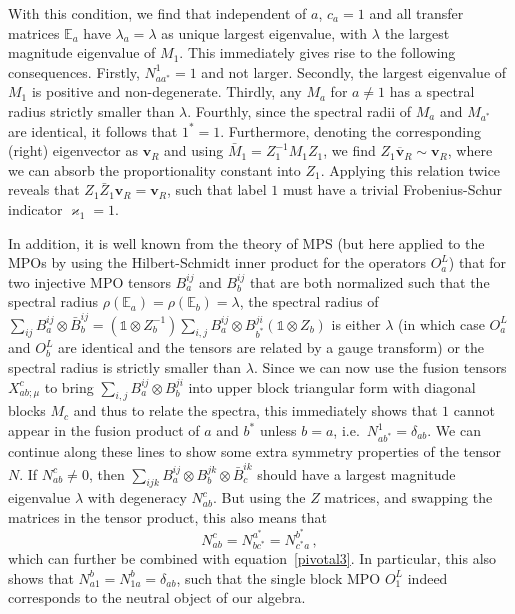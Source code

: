 \documentclass[12 pt]{article}
\begin{document}
With this condition, we find that independent of $a$, $c_a = 1$ and all transfer matrices $\mathbb{E}_{a}$ have $\lambda_a=\lambda$ as unique largest eigenvalue, with $\lambda$ the largest magnitude eigenvalue of $M_1$. This immediately gives rise to the following consequences. Firstly, $N_{aa^*}^{1}=1$ and not larger. Secondly, the largest eigenvalue of $M_1$ is positive and non-degenerate. Thirdly, any $M_{a}$ for $a\neq 1$ has a spectral radius strictly smaller than $\lambda$. Fourthly, since the spectral radii of $M_{a}$ and $M_{a^*}$ are identical, it follows that $1^* = 1$. Furthermore, denoting the corresponding (right) eigenvector as $\mathbf{v}_{R}$ and using $\bar{M}_1 = Z_1^{-1} M_1 Z_{1}$, we find $Z_1 \overline{\mathbf{v}}_{R} \sim \mathbf{v}_{R}$, where we can absorb the proportionality constant into $Z_1$. Applying this relation twice reveals that $Z_1\bar{Z}_1 \mathbf{v}_{R} = \mathbf{v}_{R}$, such that label $1$ must have a trivial Frobenius-Schur indicator $\varkappa_1=1$.

In addition, it is well known from the theory of MPS (but here applied to the MPOs by using the Hilbert-Schmidt inner product for the operators $O_a^L$) that for two injective MPO tensors $B_a^{ij}$ and $B_{b}^{ij}$ that are both normalized such that the spectral radius $\rho(\mathbb{E}_{a}) = \rho(\mathbb{E}_{b}) = \lambda$, the spectral radius of $\sum_{ij} B_{a}^{ij}\otimes \bar{B}_{b}^{ij} = (\mathds{1}\otimes Z_{b}^{-1}) \sum_{i,j} B^{ij}_a \otimes B^{ji}_{b^*} (\mathds{1}\otimes Z_{b})$ is either $\lambda$ (in which case $O_a^L$ and $O_b^L$ are identical and the tensors are related by a gauge transform) or the spectral radius is strictly smaller than $\lambda$. Since we can now use the fusion tensors $X_{ab;\mu}^{c}$ to bring $\sum_{i,j} B^{ij}_a \otimes B^{ji}_{b}$ into upper block triangular form with diagonal blocks $M_c$ and thus to relate the spectra, this immediately shows that $1$ cannot appear in the fusion product of $a$ and $b^*$ unless $b=a$, i.e.\ $N_{ab^*}^{1} = \delta_{ab}$. We can continue along these lines to show some extra symmetry properties of the tensor $N$. If $N_{ab}^{c} \neq 0$, then $\sum_{ijk} B_{a}^{ij}\otimes B_{b}^{jk} \otimes \bar{B}^{ik}_{c}$ should have a largest magnitude eigenvalue $\lambda$ with degeneracy $N_{ab}^{c}$. But using the $Z$ matrices, and swapping the matrices in the tensor product, this also means that
\begin{equation}\label{pivotal}
N_{ab}^{c} = N^{a^*}_{b c^*} = N_{c^*a}^{b^*}\, ,
\end{equation}
which can further be combined with equation~\eqref{pivotal3}. In particular, this also shows that $N_{a1}^{b} = N_{1a}^{b} = \delta_{ab}$, such that the single block MPO $O_{1}^L$ indeed corresponds to the neutral object of our algebra.
\end{document}

